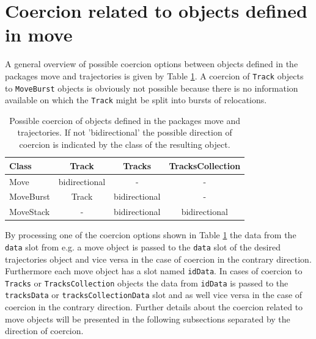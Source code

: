 \documentclass[12pt, oneside, a4paper]{scrbook}
\newcommand{\pkg}[1]{{\normalfont\fontseries{b}\selectfont #1}}
\let\code=\texttt
\begin{document}
\section{Coercion related to objects defined in \pkg{move}}
\label{sec:coercionrelatedtomove}

A general overview of possible coercion options between objects defined in the packages \pkg{move} and \pkg{trajectories} is given by Table \ref{tab:possiblecoercion}. A coercion of \code{Track} objects to \code{MoveBurst} objects is obviously not possible because there is no information available on which the \code{Track} might be split into bursts of relocations.
\par\medskip

\begin{table}[!htb]
\centering
\begin{tabular}{lccc}
\hline\hline
Class & Track & Tracks & TracksCollection\\
\hline
Move & bidirectional & - & -\\
MoveBurst & Track & bidirectional & -\\
MoveStack & - & bidirectional & bidirectional\\
\hline\hline
\end{tabular}
\caption[Coercion between \pkg{move} and \pkg{trajectories} objects]{Possible coercion of objects defined in the packages \pkg{move} and \pkg{trajectories}. If not 'bidirectional' the possible direction of coercion is indicated by the class of the resulting object.}
\label{tab:possiblecoercion}
\end{table}

\par\medskip

By processing one of the coercion options shown in Table \ref{tab:possiblecoercion} the data from the \code{data} slot from e.g. a \pkg{move} object is passed to the \code{data} slot of the desired \pkg{trajectories} object and vice versa in the case of coercion in the contrary direction.
Furthermore each \pkg{move} object has a slot named \code{idData}. In cases of coercion to \code{Tracks} or \code{TracksCollection} objects the data from \code{idData} is passed to the \code{tracksData} or \code{tracksCollectionData} slot and as well vice versa in the case of coercion in the contrary direction.
Further details about the coercion related to \pkg{move} objects will be presented in the following subsections separated by the direction of coercion.
\end{document}
